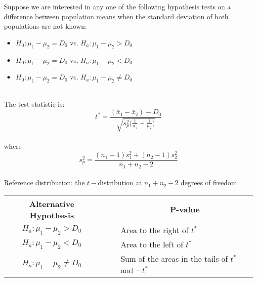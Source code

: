 \begin{hyp}
Suppose we are interested in any one of the following hypothesis tests
on a difference between population means 
when the standard deviation of both populations are not known:\\

\begin{itemize}
\item	$H_{0} : \mu_{1} - \mu_{2}  = D_{0}$  vs. $H_{a}  : \mu_{1} - \mu_{2}  > D_{0}$
\item	$H_{0} : \mu_{1} - \mu_{2}  = D_{0}$  vs. $H_{a}  : \mu_{1} - \mu_{2}  < D_{0}$
\item	$H_{0} : \mu_{1} - \mu_{2}  = D_{0}$  vs. $H_{a}  : \mu_{1} - \mu_{2}  \neq D_{0}$
\end{itemize}

\hfill\\
The test statistic is:
\begin{equation}
t^{*}	= \displaystyle\frac{ ( \bar{x}_{1} - \bar{x}_{2} ) - D_{0} }{ \sqrt{ s_{p}^{2} \bigg( \displaystyle\frac{1}{n_{1}} + \displaystyle\frac{1}{n_{2}} \bigg) } }
\end{equation}
\hfill\\
where
\begin{equation}
s_{p}^{2} =  \frac{ (n_{1} - 1) s_{1}^{2} + (n_{2} - 1) s_{2}^{2} }{ n_{1} + n_{2} - 2 }
\end{equation}
\hfill\\
Reference distribution: the $t-$distribution at $n_{1} + n_{2} - 2$ degrees of freedom.\\

\begin{center}
\begin{tabular}{ccl}
Alternative Hypothesis	&	~\quad~	&	\multicolumn{1}{c}{P-value}	\\
\hline
$H_{a}  : \mu_{1} - \mu_{2}  > D_{0}$		&	&	Area to the right of $t^{*}$	\\
$H_{a}  : \mu_{1} - \mu_{2}  < D_{0}$		&	&	Area to the left of $t^{*}$	\\
$H_{a}  : \mu_{1} - \mu_{2}  \neq D_{0}$	&	&	Sum of the areas in the tails of $t^{*}$ and $-t^{*}$
\end{tabular}
\end{center}

\end{hyp}


